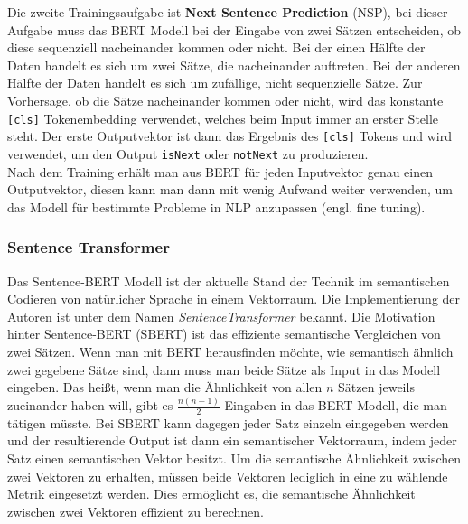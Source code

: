 \documentclass[12pt,letterpaper,ngerman]{article}
\begin{document}
Die zweite Trainingsaufgabe ist {\bf Next Sentence Prediction} (NSP),
bei dieser Aufgabe muss das BERT Modell bei der Eingabe von zwei Sätzen 
entscheiden, ob diese sequenziell nacheinander kommen oder nicht.
Bei der einen Hälfte der Daten handelt es sich um zwei Sätze, die nacheinander 
auftreten. Bei der anderen Hälfte der Daten handelt es sich um zufällige,
nicht sequenzielle Sätze. Zur Vorhersage, ob die Sätze nacheinander kommen 
oder nicht, wird das konstante \verb|[cls]| Tokenembedding verwendet, 
welches beim Input immer an erster Stelle steht. Der erste Outputvektor 
ist dann das Ergebnis des \verb|[cls]| Tokens und wird verwendet, um den Output
\verb|isNext| oder \verb|notNext| zu produzieren.\\

Nach dem Training erhält man aus BERT für jeden Inputvektor genau einen 
Outputvektor, diesen kann man dann mit wenig Aufwand weiter verwenden,
um das Modell für bestimmte Probleme in NLP anzupassen 
(engl. fine tuning).

\subsubsection{Sentence Transformer}
Das Sentence-BERT \cite{reimers2019sentencebertsentenceembeddingsusing}
Modell ist der aktuelle Stand der Technik im semantischen Codieren von 
natürlicher Sprache in einem Vektorraum. Die Implementierung der Autoren
ist unter dem Namen \textit{SentenceTransformer} bekannt. Die Motivation 
hinter Sentence-BERT (SBERT) ist das effiziente semantische Vergleichen 
von zwei Sätzen. Wenn man mit BERT herausfinden möchte, wie semantisch
ähnlich zwei gegebene Sätze sind, dann muss man beide Sätze als Input 
in das Modell eingeben. Das heißt, wenn man die Ähnlichkeit von allen
$n$ Sätzen jeweils zueinander haben will, gibt es $\frac{n(n-1)}{2}$ 
Eingaben in das BERT Modell, die man tätigen müsste.
Bei SBERT kann dagegen jeder Satz einzeln eingegeben werden und der
resultierende Output ist dann ein semantischer Vektorraum, indem jeder 
Satz einen semantischen Vektor besitzt. Um die semantische Ähnlichkeit 
zwischen zwei Vektoren zu erhalten, müssen beide Vektoren lediglich in 
eine zu wählende Metrik eingesetzt werden. 
Dies ermöglicht es, die semantische Ähnlichkeit zwischen zwei Vektoren 
effizient zu berechnen.\\
\end{document}
